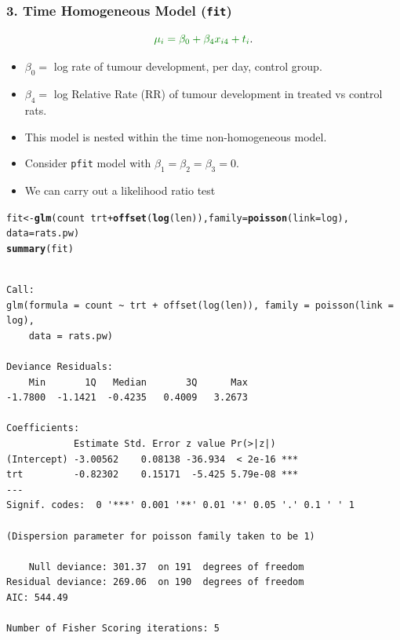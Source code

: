 \documentclass[oneside]{book}\usepackage[]{graphicx}\usepackage[svgnames]{xcolor}
\makeatletter
\newcommand{\hlopt}[1]{\textcolor[rgb]{0,0,0}{#1}}%
\newcommand{\hlstd}[1]{\textcolor[rgb]{0.345,0.345,0.345}{#1}}%
\newcommand{\hlkwb}[1]{\textcolor[rgb]{0.69,0.353,0.396}{#1}}%
\newcommand{\hlkwc}[1]{\textcolor[rgb]{0.333,0.667,0.333}{#1}}%
\newcommand{\hlkwd}[1]{\textcolor[rgb]{0.737,0.353,0.396}{\textbf{#1}}}%
\newenvironment{kframe}{%
 \def\at@end@of@kframe{}%
 \ifinner\ifhmode%
  \def\at@end@of@kframe{\end{minipage}}%
  \begin{minipage}{\columnwidth}%
 \fi\fi%
 \def\FrameCommand##1{\hskip\@totalleftmargin \hskip-\fboxsep
 \colorbox{shadecolor}{##1}\hskip-\fboxsep
     \hskip-\linewidth \hskip-\@totalleftmargin \hskip\columnwidth}%
 \MakeFramed {\advance\hsize-\width
   \@totalleftmargin\z@ \linewidth\hsize
   \@setminipage}}%
 {\par\unskip\endMakeFramed%
 \at@end@of@kframe}
\newenvironment{knitrout}{}{} %
\let\log\relax%
\makeatother
\begin{document}
\subsubsection*{3. Time Homogeneous Model (\texttt{fit})}
\[ \textcolor{Green}{\log{\mu_i}=\beta_0+\beta_4x_{i4}+\log{t_i}}. \]
\begin{itemize}
      \item $ \beta_0= $ log rate of tumour development, per day, control group.
      \item $ \beta_4= $ log Relative Rate (RR) of tumour development in treated vs control rats.
      \item This model is nested within the time non-homogeneous model.
      \item Consider \texttt{pfit} model with $ \beta_1=\beta_2=\beta_3=0 $.
      \item We can carry out a likelihood ratio test
\end{itemize}
\begin{knitrout}
\color{fgcolor}\begin{kframe}
\begin{alltt}
\hlstd{fit} \hlkwb{<-} \hlkwd{glm}\hlstd{(count} \hlopt{~} \hlstd{trt} \hlopt{+} \hlkwd{offset}\hlstd{(}\hlkwd{log}\hlstd{(len)),} \hlkwc{family} \hlstd{=} \hlkwd{poisson}\hlstd{(}\hlkwc{link} \hlstd{= log),}
  \hlkwc{data} \hlstd{= rats.pw)}
\hlkwd{summary}\hlstd{(fit)}
\end{alltt}
\begin{verbatim}

Call:
glm(formula = count ~ trt + offset(log(len)), family = poisson(link = log), 
    data = rats.pw)

Deviance Residuals: 
    Min       1Q   Median       3Q      Max  
-1.7800  -1.1421  -0.4235   0.4009   3.2673  

Coefficients:
            Estimate Std. Error z value Pr(>|z|)    
(Intercept) -3.00562    0.08138 -36.934  < 2e-16 ***
trt         -0.82302    0.15171  -5.425 5.79e-08 ***
---
Signif. codes:  0 '***' 0.001 '**' 0.01 '*' 0.05 '.' 0.1 ' ' 1

(Dispersion parameter for poisson family taken to be 1)

    Null deviance: 301.37  on 191  degrees of freedom
Residual deviance: 269.06  on 190  degrees of freedom
AIC: 544.49

Number of Fisher Scoring iterations: 5
\end{verbatim}
\end{kframe}
\end{knitrout}
\end{document}
